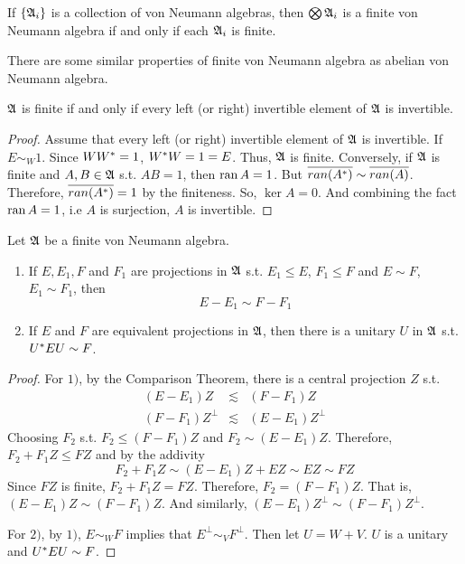 \begin{cor}
	If $\{\mathfrak{A}_i\}$ is a collection of von Neumann algebras, then $\bigotimes \mathfrak{A}_i$ is a finite von Neumann algebra if and only if each $\mathfrak{A}_i$ is finite.
\end{cor}

There are some similar properties of finite von Neumann algebra as abelian von Neumann algebra.

\begin{prop}
	$\mathfrak{A}$ is finite if and only if every left (or right) invertible element of $\mathfrak{A}$ is invertible.
\end{prop}
\begin{proof}
	Assume that every left (or right) invertible element of $\mathfrak{A}$ is invertible. If $E \sim_W 1$. Since $WW^{*} = 1$, $W^{*}W = 1 =E$. Thus, $\mathfrak{A}$ is finite. Conversely, if $\mathfrak{A}$ is finite and $A, B \in \mathfrak{A}$ s.t. $AB = 1$, then $\operatorname{ran}{A} = 1$. But $\overline{ran(A^{*})} \sim \overline{ran(A)}$. Therefore, $\overline{ran(A^{*})} = 1$ by the finiteness. So, $\ker{A} = 0$. And combining the fact $\operatorname{ran}{A} = 1$, i.e $A$ is surjection, $A$ is invertible.
\end{proof}

\begin{prop}
	Let $\mathfrak{A}$ be a finite von Neumann algebra.
	\begin{enumerate}[label=\arabic*)]
		\item If $E, E_1, F$ and $F_1$ are projections in $\mathfrak{A}$ s.t. $E_1 \leqslant E$, $F_1 \leqslant F$ and $E \sim F$, $E_1 \sim F_1$, then 
		\begin{equation*}
			E - E_1 \sim F - F_1
		\end{equation*}
		\item If $E$ and $F$ are equivalent projections in $\mathfrak{A}$, then there is a unitary  $U$ in $\mathfrak{A}$ s.t. $U^{*}EU \sim F$.
	\end{enumerate}
\end{prop}
\begin{proof}
	For $1)$, by the Comparison Theorem, there is a central projection $Z$ s.t.
	\begin{eqnarray*}
		(E - E_1)Z &\lesssim& (F - F_1)Z \\
		(F - F_1)Z^{\bot} &\lesssim& (E - E_1)Z^{\bot}
	\end{eqnarray*}
	Choosing $F_2$ s.t. $F_2 \leqslant (F - F_1)Z$ and $F_2 \sim (E - E_1)Z$. Therefore, $F_2 + F_1Z \leqslant FZ$ and by the addivity
	\begin{equation*}
		F_2 + F_1Z \sim (E - E_1)Z + EZ \sim EZ \sim FZ
	\end{equation*}
	Since $FZ$ is finite, $F_2 + F_1Z = FZ$. Therefore, $F_2 = (F-F_1)Z$. That is, $(E - E_1)Z \sim (F - F_1)Z$. And similarly, $(E - E_1)Z^{\bot} \sim (F - F_1)Z^{\bot}$.
	\item For $2)$, by $1)$, $E \sim_W F$ implies that $E^{\bot} \sim_V F^{\bot}$. Then let $U = W + V$. $U$ is a unitary and $U^{*}EU \sim F$.
\end{proof}

